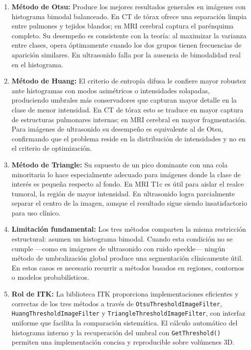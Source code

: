 \documentclass[12pt, a4paper]{article}
\begin{document}
\begin{enumerate}

  \item \textbf{Método de Otsu:} Produce los mejores resultados generales en imágenes
    con histograma bimodal balanceado. En CT de tórax ofrece una separación limpia entre
    pulmones y tejidos blandos; en MRI cerebral captura el parénquima completo. Su
    desempeño es consistente con la teoría: al maximizar la varianza entre clases,
    opera óptimamente cuando los dos grupos tienen frecuencias de aparición similares.
    En ultrasonido falla por la ausencia de bimodalidad real en el histograma.

  \item \textbf{Método de Huang:} El criterio de entropía difusa le confiere mayor
    robustez ante histogramas con modos asimétricos o intensidades solapadas, produciendo
    umbrales más conservadores que capturan mayor detalle en la clase de menor intensidad.
    En CT de tórax esto se traduce en mayor captura de estructuras pulmonares internas;
    en MRI cerebral en mayor fragmentación. Para imágenes de ultrasonido su desempeño
    es equivalente al de Otsu, confirmando que el problema reside en la distribución
    de intensidades y no en el criterio de optimización.

  \item \textbf{Método de Triangle:} Su supuesto de un pico dominante con una cola
    minoritaria lo hace especialmente adecuado para imágenes donde la clase de interés
    es pequeña respecto al fondo. En MRI T1c es útil para aislar el realce tumoral,
    la región de mayor intensidad. En ultrasonido logra parcialmente separar el centro
    de la imagen, aunque el resultado sigue siendo insatisfactorio para uso clínico.

  \item \textbf{Limitación fundamental:} Los tres métodos comparten la misma restricción
    estructural: asumen un histograma bimodal. Cuando esta condición no se cumple
    —como en imágenes de ultrasonido con ruido speckle— ningún método de umbralización
    global produce una segmentación clínicamente útil. En estos casos es necesario
    recurrir a métodos basados en regiones, contornos o modelos probabilísticos.

  \item \textbf{Rol de ITK:} La biblioteca ITK proporciona implementaciones eficientes
    y correctas de los tres métodos a través de \texttt{OtsuThresholdImageFilter},
    \texttt{HuangThresholdImageFilter} y \texttt{TriangleThresholdImageFilter}, con
    interfaz uniforme que facilita la comparación sistemática. El cálculo automático
    del histograma interno y la recuperación del umbral con \texttt{GetThreshold()}
    permiten una implementación concisa y reproducible sobre volúmenes 3D.


\end{enumerate}
\end{document}
